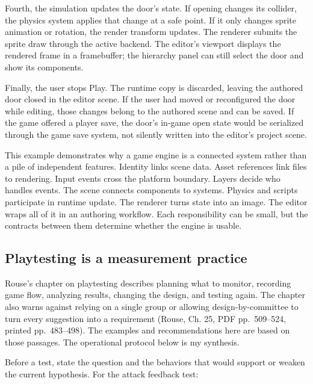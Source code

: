 Fourth, the simulation updates the door's state. If opening changes its collider, the physics system applies that change at a safe point. If it only changes sprite animation or rotation, the render transform updates. The renderer submits the sprite draw through the active backend. The editor's viewport displays the rendered frame in a framebuffer; the hierarchy panel can still select the door and show its components.

Finally, the user stops Play. The runtime copy is discarded, leaving the authored door closed in the editor scene. If the user had moved or reconfigured the door while editing, those changes belong to the authored scene and can be saved. If the game offered a player save, the door's in-game open state would be serialized through the game save system, not silently written into the editor's project scene.

This example demonstrates why a game engine is a connected system rather than a pile of independent features. Identity links scene data. Asset references link files to rendering. Input events cross the platform boundary. Layers decide who handles events. The scene connects components to systems. Physics and scripts participate in runtime update. The renderer turns state into an image. The editor wraps all of it in an authoring workflow. Each responsibility can be small, but the contracts between them determine whether the engine is usable.

\subsection{Playtesting is a measurement practice}\label{06-engine-ii-ch041-playtesting-is-a-measurement-practice}

Rouse's chapter on playtesting describes planning what to monitor, recording game flow, analyzing results, changing the design, and testing again. The chapter also warns against relying on a single group or allowing design-by-committee to turn every suggestion into a requirement (Rouse, Ch. 25, PDF pp.~509--524, printed pp.~483--498). The examples and recommendations here are based on those passages. The operational protocol below is my synthesis.

Before a test, state the question and the behaviors that would support or weaken the current hypothesis. For the attack feedback test:

